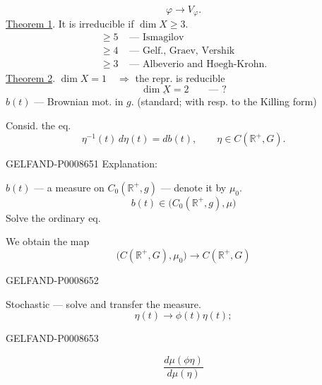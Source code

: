 \[
\varphi\longrightarrow V_\varphi.
\]
\uline{Theorem 1}. It is irreducible if \(\dim X\geq 3\).
\[
\begin{aligned}
\geq5&\text{ — Ismagilov}\\
\geq4&\text{ — Gelf., Graev, Vershik}\\
\geq3&\text{ — Albeverio and Høegh-Krohn.}
\end{aligned}
\]
\uline{Theorem 2}. \(\dim X=1\quad\Rightarrow\) the repr. is reducible
\[
\underline{\dim X=2}\qquad\text{— ?}
\]
\(b(t)\) — Brownian mot. in \(g\). (standard; with resp. to the Killing form)

Consid. the eq.
\[
\eta^{-1}(t)\,d\eta(t)=db(t),\qquad
\eta\in C(\mathbb R^+,G).\tag{3}
\]


\begin{GelfandAdjacentEvidence}{GELFAND-P000865}{1}
Explanation:

\(b(t)\) — a measure on \(C_0(\mathbb R^+,g)\) — denote it by \(\mu_0\).
\[
b(t)\in\bigl(C_0(\mathbb R^+,g),\mu\bigr)
\]
Solve the ordinary eq.
 
We obtain the map
\[
\bigl(C(\mathbb R^+,G),\mu_0\bigr)\longrightarrow C(\mathbb R^+,G)
\]
\end{GelfandAdjacentEvidence}
\begin{GelfandAdjacentEvidence}{GELFAND-P000865}{2}


Stochastic — solve and transfer the measure.
\[
\eta(t)\longrightarrow\phi(t)\eta(t);
\]
\end{GelfandAdjacentEvidence}
\begin{GelfandAdjacentEvidence}{GELFAND-P000865}{3}

\[
\frac{d\mu(\phi\eta)}{d\mu(\eta)}
\]
\end{GelfandAdjacentEvidence}
